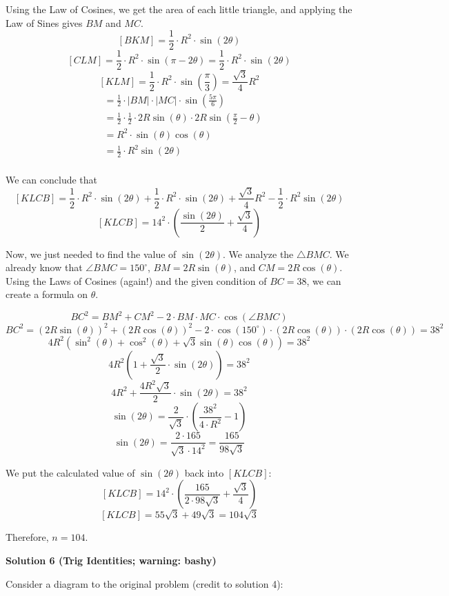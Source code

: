 \begin{enumerate}
 Using the Law of Cosines, we get the area of each little triangle, and applying the Law of Sines gives $BM$ and $MC$.
 \[[BKM] = \frac{1}{2}\cdot R^2\cdot\sin(2\theta)\]
 \[[CLM] = \frac{1}{2}\cdot R^2\cdot\sin(\pi-2\theta) = \frac{1}{2}\cdot R^2\cdot\sin(2\theta)\]
 \[[KLM] = \frac{1}{2}\cdot R^{2} \cdot\sin({\frac{\pi}{3}})=\frac{\sqrt3}{4}R^2\]\begin{align*}[BMC] & = \frac{1}{2}\cdot|BM|\cdot|MC|\cdot\sin({\frac{5\pi}{6}})\\&= \frac{1}{2}\cdot\frac{1}{2}\cdot2R\sin(\theta)\cdot2R\sin(\frac{\pi}{2}-\theta)\\&= R^2\cdot\sin(\theta)\cos(\theta)\\&= \frac{1}{2}\cdot R^2\sin(2\theta)\\\end{align*}


 We can conclude that
 \[[KLCB] = \frac{1}{2}\cdot R^2\cdot\sin(2\theta)+\frac{1}{2}\cdot R^2\cdot\sin(2\theta)+\frac{\sqrt3}{4}R^2-\frac{1}{2}\cdot R^2\sin(2\theta)\]
 \[[KLCB] = {14}^2\cdot(\frac{\sin(2\theta)}{2}+\frac{\sqrt3}{4})\]

 Now, we just needed to find the value of $\sin(2\theta)$. We analyze the $\triangle{BMC}$. We already know that $\angle{BMC} = {150}^{\circ}$, $BM = 2R\sin(\theta)$, and $CM = 2R\cos(\theta)$. Using the Laws of Cosines (again!) and the given condition of $BC = 38$, we can create a formula on $\theta$.

 
 \[{BC}^2 = {BM}^2+{CM}^2-2\cdot BM\cdot MC\cdot\cos(\angle{BMC})\]
 \[{BC}^2 = (2R\sin(\theta))^2+(2R\cos(\theta))^2-2\cdot\cos({150}^{\circ})\cdot(2R\cos(\theta))\cdot(2R\cos(\theta)) = {38}^2\]
 \[4R^2(\sin^2(\theta)+\cos^2(\theta)+\sqrt3\sin(\theta)\cos(\theta)) = {38}^2\]
 \[4R^2(1+\frac{\sqrt3}{2}\cdot\sin(2\theta)) = {38}^2\]
 \[4R^2+\frac{4R^2\sqrt3}{2}\cdot\sin(2\theta) = {38}^2\]
 \[\sin(2\theta) = \frac{2}{\sqrt3}\cdot(\frac{{38}^2}{4\cdot{R}^2}-1)\]
 \[\sin(2\theta) = \frac{2\cdot165}{\sqrt3\cdot{14}^2} = \frac{165}{98\sqrt3}\]

 We put the calculated value of $\sin(2\theta)$ back into $[KLCB]$:
 \[[KLCB] = {14}^2\cdot(\frac{165}{2\cdot98\sqrt3}+\frac{\sqrt3}{4})\]
 \[[KLCB] = 55\sqrt3+49\sqrt3 = 104\sqrt3\]

 Therefore, $n=\boxed{104}$.

 



\textbf{Solution 6 (Trig Identities; warning: bashy)}

Consider a diagram to the original problem (credit to solution 4):


\end{enumerate}
